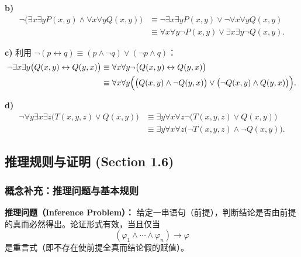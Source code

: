 \documentclass[11pt,UTF8]{article}
\begin{document}
\textbf{b)}
\begin{align*}
\neg \bigl(\exists x \exists y P(x,y) \land \forall x \forall y Q(x,y)\bigr)
&\equiv \neg \exists x \exists y P(x,y) \lor \neg \forall x \forall y Q(x,y) \\
&\equiv \forall x \forall y \neg P(x,y) \lor \exists x \exists y \neg Q(x,y).
\end{align*}

\textbf{c)} 利用 $\neg (p \leftrightarrow q) \equiv (p \land \neg q) \lor (\neg p \land q)$：
\begin{align*}
\neg \exists x \exists y \bigl(Q(x,y) \leftrightarrow Q(y,x)\bigr)
&\equiv \forall x \forall y \neg \bigl(Q(x,y) \leftrightarrow Q(y,x)\bigr) \\
&\equiv \forall x \forall y \Bigl(\bigl(Q(x,y) \land \neg Q(y,x)\bigr) \lor \bigl(\neg Q(x,y) \land Q(y,x)\bigr)\Bigr).
\end{align*}

\textbf{d)}
\begin{align*}
\neg \forall y \exists x \exists z \bigl(T(x,y,z) \lor Q(x,y)\bigr)
&\equiv \exists y \forall x \forall z \neg \bigl(T(x,y,z) \lor Q(x,y)\bigr) \\
&\equiv \exists y \forall x \forall z \bigl(\neg T(x,y,z) \land \neg Q(x,y)\bigr).
\end{align*}



\subsection{推理规则与证明 (Section 1.6)}

\subsubsection*{概念补充：推理问题与基本规则}
\textbf{推理问题（Inference Problem）：} 给定一串语句（前提），判断结论是否由前提的真而必然得出。论证形式有效，当且仅当
\[ (\varphi_1 \land \cdots \land \varphi_n) \to \varphi \]
是重言式（即不存在使前提全真而结论假的赋值）。
\end{document}
